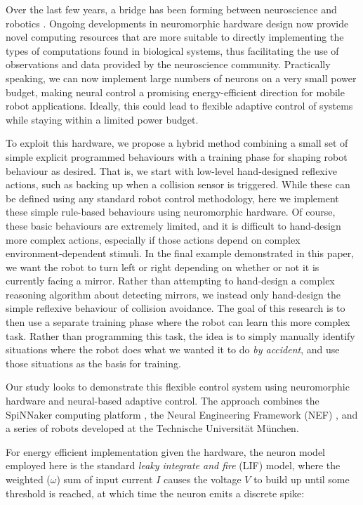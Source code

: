 \documentclass{frontiersSCNS}
\begin{document}
Over the last few years, a bridge has been forming between neuroscience and 
robotics \citep{krichmar2011}. Ongoing developments in neuromorphic hardware 
design now provide novel computing resources that are more suitable to
directly implementing the types of computations found in biological systems, 
thus facilitating the use of observations and data provided by the 
neuroscience community. Practically speaking, we can now implement large numbers of 
neurons on a very small power budget, making neural control a promising 
energy-efficient direction for mobile robot applications.  Ideally, this could
lead to flexible adaptive control of systems while staying within a limited
power budget.

To exploit this hardware, we propose a hybrid method combining a small set of
simple explicit programmed behaviours with a training phase for shaping robot
behaviour as desired.  That is, we start with low-level hand-designed reflexive
actions, such as backing up when a collision sensor is triggered.  While these can be defined using
any standard robot control methodology, here we implement these simple rule-based
behaviours using neuromorphic hardware.  Of course, these basic behaviours
are extremely limited, and it is difficult to hand-design more complex actions,
especially if those actions depend on complex environment-dependent stimuli.
In the final example demonstrated in this paper, we want the robot to turn
left or right depending on whether or not it is currently facing a mirror.
Rather than attempting to hand-design a complex reasoning algorithm about detecting
mirrors, we instead only hand-design the simple reflexive behaviour of collision
avoidance.  The goal of this research is to then use a separate training phase
where the robot can learn this more complex task.  Rather than programming this
task, the idea is to simply manually identify situations where the robot
does what we wanted it to do \textit{by accident}, and use those situations as
the basis for training.

Our study looks to demonstrate this flexible control system using 
neuromorphic hardware and neural-based adaptive control. The approach 
combines the SpiNNaker computing 
platform \citep{furber2007neural, furber2014spinnaker}, the Neural Engineering 
Framework (NEF)  \citep{eliasmith2004neural}, and a series of robots developed at 
the Technische Universit{\"a}t M{\"u}nchen. 


For energy efficient implementation given the hardware, the neuron model
employed here is the standard \textit{leaky integrate and fire} (LIF) model, 
where the weighted ($\omega$) sum of input current $I$ causes the voltage $V$ to build up until some
threshold is reached, at which time the neuron emits a discrete spike:
\end{document}
